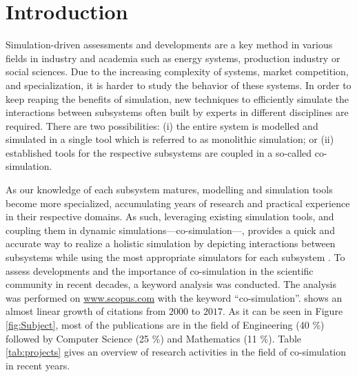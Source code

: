 \section{Introduction}

Simulation-driven assessments and developments are a key method in various fields in industry and academia such as energy systems, production industry or social sciences. Due to the increasing complexity of systems, market competition, and specialization, it is harder to study the behavior of these systems. 
In order to keep reaping the benefits of simulation, new techniques to efficiently simulate the interactions between subsystems often built by  experts in different disciplines are required. There are two possibilities: (i) the entire system is modelled and simulated in a single tool which is referred to as monolithic simulation; or (ii) established tools for the respective subsystems are coupled in a so-called co-simulation. 

As our knowledge of each subsystem matures, modelling and simulation tools become more specialized, accumulating years of research and practical experience in their respective domains. 
As such, leveraging existing simulation tools, and coupling them in dynamic simulations---co-simulation---, provides a quick and accurate way to realize a holistic simulation by depicting interactions between subsystems while using the most appropriate simulators for each subsystem \cite{VanderAuweraer2013}. 
To assess developments and the importance of co-simulation in the scientific community in recent decades, a keyword analysis was conducted. 
The analysis was performed on \url{www.scopus.com} with the keyword ``co-simulation''. 
 shows an almost linear growth of citations from $2000$ to $2017$. As it can be seen in Figure \ref{fig:Subject}, most of the publications are in the field of Engineering (40 \%) followed by Computer Science (25 \%) and Mathematics (11 \%).
Table \ref{tab:projects} gives an overview of research activities in the field of co-simulation in recent years.

